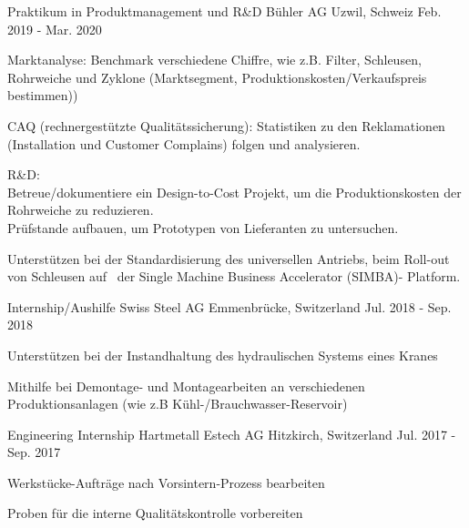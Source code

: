 

\begin{cventries}

\cventry
	{Praktikum in Produktmanagement und R\&D} %
	{Bühler AG} %
	{Uzwil, Schweiz} %
	{Feb. 2019 - Mar. 2020} %
	{
		\begin{cvitems} %
			\item {Marktanalyse: Benchmark verschiedene Chiffre, wie z.B. Filter, Schleusen, Rohrweiche und Zyklone (Marktsegment, Produktionskosten/Verkaufspreis bestimmen))}
			\item {CAQ (rechnergestützte Qualitätssicherung): Statistiken zu den Reklamationen (Installation und Customer Complains) folgen und analysieren.}
			\item {R\&D:}\\
			{Betreue/dokumentiere ein Design-to-Cost Projekt, um die Produktionskosten der Rohrweiche zu reduzieren.}\\
			{Prüfstande aufbauen, um Prototypen von Lieferanten zu untersuchen.}
			\item {Unterstützen bei der Standardisierung des universellen Antriebs, beim Roll-out von Schleusen auf  der Single Machine Business Accelerator (SIMBA)- Platform.}
		\end{cvitems}
}	


\cventry
	{Internship/Aushilfe} %
	{Swiss Steel AG} %
	{Emmenbrücke, Switzerland} %
	{Jul. 2018 - Sep. 2018} %
	{
		\begin{cvitems} %
			\item {Unterstützen bei der Instandhaltung des hydraulischen Systems eines Kranes}
			\item {Mithilfe bei Demontage- und Montagearbeiten an verschiedenen Produktionsanlagen (wie z.B Kühl-/Brauchwasser-Reservoir)}
		\end{cvitems}
}	

\cventry
	{Engineering Internship} %
	{Hartmetall Estech AG} %
	{Hitzkirch, Switzerland} %
	{Jul. 2017 - Sep. 2017} %
	{
		\begin{cvitems} %
			\item {Werkstücke-Aufträge nach Vorsintern-Prozess bearbeiten}
			\item {Proben für die interne Qualitätskontrolle vorbereiten}
		\end{cvitems}
}


\end{cventries}

